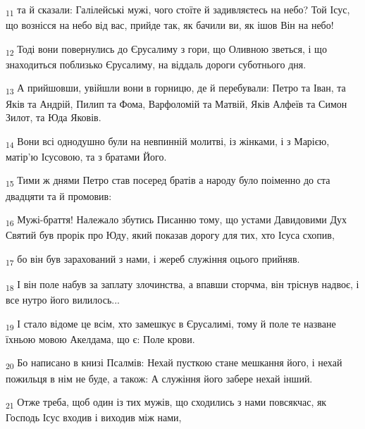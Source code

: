 \begin{tcolorbox}
\textsubscript{11} та й сказали: Галілейські мужі, чого стоїте й задивляєтесь на небо? Той Ісус, що вознісся на небо від вас, прийде так, як бачили ви, як ішов Він на небо!
\end{tcolorbox}
\begin{tcolorbox}
\textsubscript{12} Тоді вони повернулись до Єрусалиму з гори, що Оливною зветься, і що знаходиться поблизько Єрусалиму, на віддаль дороги суботнього дня.
\end{tcolorbox}
\begin{tcolorbox}
\textsubscript{13} А прийшовши, увійшли вони в горницю, де й перебували: Петро та Іван, та Яків та Андрій, Пилип та Фома, Варфоломій та Матвій, Яків Алфеїв та Симон Зилот, та Юда Яковів.
\end{tcolorbox}
\begin{tcolorbox}
\textsubscript{14} Вони всі однодушно були на невпинній молитві, із жінками, і з Марією, матір'ю Ісусовою, та з братами Його.
\end{tcolorbox}
\begin{tcolorbox}
\textsubscript{15} Тими ж днями Петро став посеред братів а народу було поіменно до ста двадцяти та й промовив:
\end{tcolorbox}
\begin{tcolorbox}
\textsubscript{16} Мужі-браття! Належало збутись Писанню тому, що устами Давидовими Дух Святий був прорік про Юду, який показав дорогу для тих, хто Ісуса схопив,
\end{tcolorbox}
\begin{tcolorbox}
\textsubscript{17} бо він був зарахований з нами, і жереб служіння оцього прийняв.
\end{tcolorbox}
\begin{tcolorbox}
\textsubscript{18} І він поле набув за заплату злочинства, а впавши сторчма, він тріснув надвоє, і все нутро його вилилось...
\end{tcolorbox}
\begin{tcolorbox}
\textsubscript{19} І стало відоме це всім, хто замешкує в Єрусалимі, тому й поле те назване їхньою мовою Акелдама, що є: Поле крови.
\end{tcolorbox}
\begin{tcolorbox}
\textsubscript{20} Бо написано в книзі Псалмів: Нехай пусткою стане мешкання його, і нехай пожильця в нім не буде, а також: А служіння його забере нехай інший.
\end{tcolorbox}
\begin{tcolorbox}
\textsubscript{21} Отже треба, щоб один із тих мужів, що сходились з нами повсякчас, як Господь Ісус входив і виходив між нами,
\end{tcolorbox}
